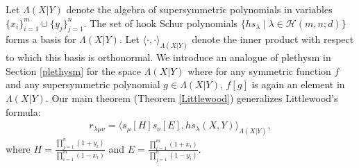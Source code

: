 \documentclass[12pt,reqno]{amsart}
\newtheorem{theorem}{Theorem}[section]
\theoremstyle{definition}
\theoremstyle{remark}
\newcommand{\Hi}{\mathcal{H}(m,n;d)}
\begin{document}
Let $\Lambda(X|Y)$ denote the algebra of supersymmetric polynomials \cite{stembridge1985characterization} in variables $\{x_{i}\}_{i=1}^{m}\cup\{y_{j}\}_{j=1}^{n}$. The set of hook Schur polynomials $\{hs_{\lambda}\mid\lambda\in\Hi\}$ forms a basis for $\Lambda(X|Y)$. Let $\langle\cdot,\cdot\rangle_{\Lambda(X|Y)}$ denote the inner product with respect to which this basis is orthonormal. We introduce an analogue of plethysm in Section \ref{plethysm} for the space $\Lambda(X|Y)$ where for any symmetric function $f$ and any supersymmetric polynomial $g\in\Lambda(X|Y)$, $f[g]$ is again an element in $\Lambda(X|Y)$. Our main theorem (Theorem \ref{Littlewood}) generalizes Littlewood's formula:
\begin{align}\label{introLittlewood}
    r_{\lambda\mu\nu} = \langle s_{\mu}[H]s_{\nu}[E], hs_{\lambda}(X,Y) \rangle_{\Lambda(X|Y)},
\end{align}
where
$H=\frac{\prod_{j=1}^{n}(1+y_{i})}{\prod_{i=1}^{m}(1-x_{i})}$ and 
$E=\frac{\prod_{i=1}^{m}(1+x_{i})}{\prod_{j=1}^{n}(1-y_{i})}.$

\end{document}
